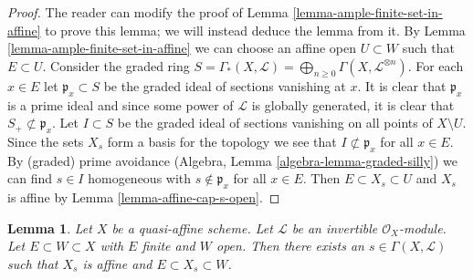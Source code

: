 \documentclass{stacks-project}
\theoremstyle{plain}
\newtheorem{lemma}[subsection]{Lemma}
\theoremstyle{definition}
\theoremstyle{remark}
\numberwithin{equation}{subsection}
\begin{document}
\begin{proof}
The reader can modify the proof of Lemma \ref{lemma-ample-finite-set-in-affine}
to prove this lemma; we will instead deduce the lemma from it.
By Lemma \ref{lemma-ample-finite-set-in-affine} we can choose an affine
open $U \subset W$ such that $E \subset U$.
Consider the graded ring $S = \Gamma_*(X, \mathcal{L}) =
\bigoplus_{n \geq 0} \Gamma(X, \mathcal{L}^{\otimes n})$.
For each $x \in E$ let $\mathfrak p_x \subset S$ be the graded ideal
of sections vanishing at $x$. It is clear that $\mathfrak p_x$ is
a prime ideal and since some power of $\mathcal{L}$ is globally
generated, it is clear that $S_{+} \not \subset \mathfrak p_x$.
Let $I \subset S$ be the graded ideal of sections vanishing on all
points of $X \setminus U$. Since the sets $X_s$ form a basis
for the topology we see that $I \not \subset \mathfrak p_x$ for
all $x \in E$.
By (graded) prime avoidance (Algebra, Lemma \ref{algebra-lemma-graded-silly})
we can find $s \in I$ homogeneous
with $s \not \in \mathfrak p_x$ for all $x \in E$.
Then $E \subset X_s \subset U$ and $X_s$ is affine by
Lemma \ref{lemma-affine-cap-s-open}.
\end{proof}

\begin{lemma}
\label{lemma-quasi-affine-invertible-nonvanishing-section}
Let $X$ be a quasi-affine scheme. Let $\mathcal{L}$ be an invertible
$\mathcal{O}_X$-module. Let $E \subset W \subset X$ with $E$ finite
and $W$ open. Then there exists an $s \in \Gamma(X, \mathcal{L})$
such that $X_s$ is affine and $E \subset X_s \subset W$.
\end{lemma}
\end{document}
